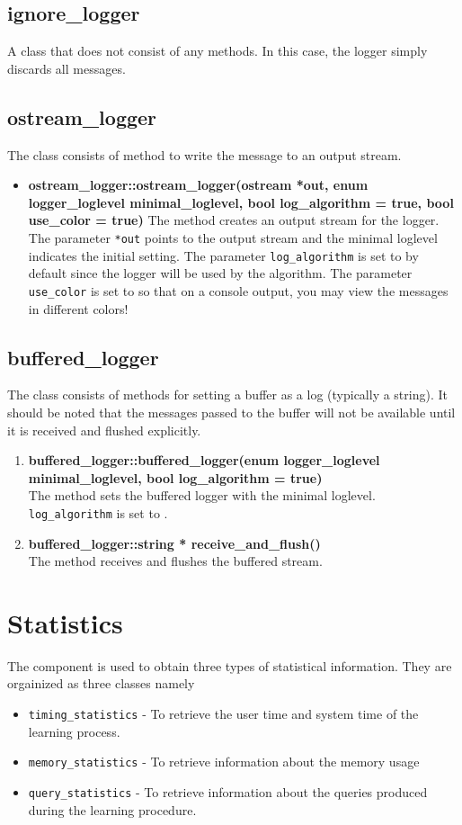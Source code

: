 \subsection*{ignore\_logger}
A class that does not consist of any methods. In this case, the logger simply discards all messages.

\subsection*{ostream\_logger}
The class consists of method to write the message to an output stream. 
\begin{itemize}
 \item \textbf{ostream\_logger::ostream\_logger(ostream *out, enum logger\_loglevel minimal\_loglevel, bool log\_algorithm = true, bool use\_color = true)} \vskip 1pt
	The method creates an output stream for the logger. The parameter \texttt{*out} points to the output stream and the minimal loglevel indicates the initial setting. The parameter \texttt{log\_algorithm} is set to \true by default since the logger will be used by the algorithm. The parameter \texttt{use\_color} is set to \true so that on a console output, you may view the messages in different colors!
\end{itemize}

\subsection*{buffered\_logger}
The class consists of methods for setting a buffer as a log (typically a string). It should be noted that the messages passed to the buffer will not be available until it is received and flushed explicitly.

\begin{enumerate}
 \item \textbf{buffered\_logger::buffered\_logger(enum logger\_loglevel minimal\_loglevel, bool log\_algorithm = true)} \\
	The method sets the buffered logger with the minimal loglevel. \texttt{log\_algorithm} is set to \true.
 \item \textbf{buffered\_logger::string * receive\_and\_flush()} \\
	The method receives and flushes the buffered stream.
\end{enumerate}

\section{Statistics}
The component is used to obtain three types of statistical information. They are orgainized as three classes namely 
\begin{itemize}
\item \texttt{timing\_statistics} - To retrieve the user time and system time of the learning process.
\item \texttt{memory\_statistics} - To retrieve information about the memory usage
\item \texttt{query\_statistics} - To retrieve information about the queries produced during the learning procedure.
\end{itemize}

